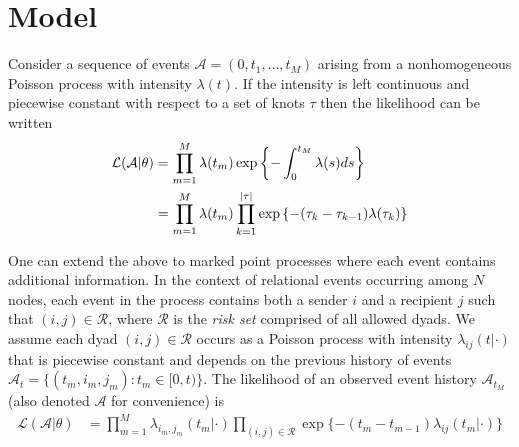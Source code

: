 \section{Model}

Consider a sequence of events $\mathcal{A} = (0,t_1, \ldots, t_M)$ arising from a nonhomogeneous Poisson process with  intensity $\lambda(t)$.
If the intensity is left continuous and piecewise constant with respect to a set of knots $\tau$ then the likelihood can be written
\begin{align}
\mathcal{L}(\mathcal{A}|\theta) &= \prod_{m=1}^M \lambda(t_m) \exp\left\{ - \int_{0}^{t_M} \lambda(s)ds \right\} \notag  \\
&= \prod_{m=1}^M \lambda(t_m) \prod_{k=1}^{|\tau|} \exp\left\{ - (\tau_{k} - \tau_{k-1}) \lambda(\tau_k) \right\}%
\end{align}


One can extend the above to marked point processes where each event contains additional information.
In the context of relational events occurring among $N$ nodes, each event in the process contains both a sender $i$ and a recipient $j$ such that  $(i,j) \in \mathcal{R}$, where $\mathcal{R}$ is the \emph{risk set} comprised of all allowed dyads.
We assume each dyad $(i,j) \in \mathcal{R}$ occurs as a Poisson process with intensity $\lambda_{ij}(t|\cdot)$ that is piecewise constant and depends on the previous history of events  $\mathcal{A}_t = \{(t_m,i_m,j_m): t_m \in [0,t) \}$.
The likelihood of an observed event history $\mathcal{A}_{t_M}$ (also denoted $\mathcal{A}$ for convenience) is
\begin{align}
\mathcal{L}(\mathcal{A}|\theta) &= \prod_{m=1}^M \lambda_{i_m,j_m}(t_m|\cdot) \prod_{(i,j) \in \mathcal{R}}\exp\{ - (t_m - t_{m-1}) \lambda_{ij}(t_m | \cdot) \}
\label{eqn:llk}
\end{align}

